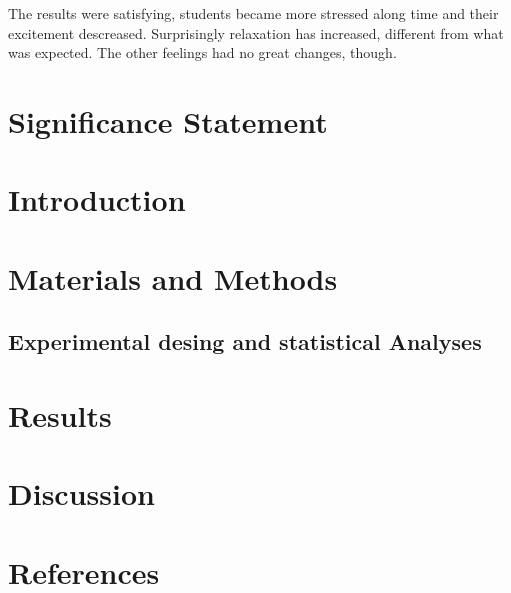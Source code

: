 \documentclass[12pt,openright,a4paper]{article}
\begin{document}
The results were satisfying,  students became more stressed along time and their excitement descreased.     Surprisingly relaxation has increased, different from what was expected. The other feelings had no great changes, though.

\section{Significance Statement}
\section{Introduction}
\section{Materials and Methods}
\subsection{Experimental desing and statistical Analyses}
\section{Results}
\section{Discussion}
\section{References}
\end{document}

